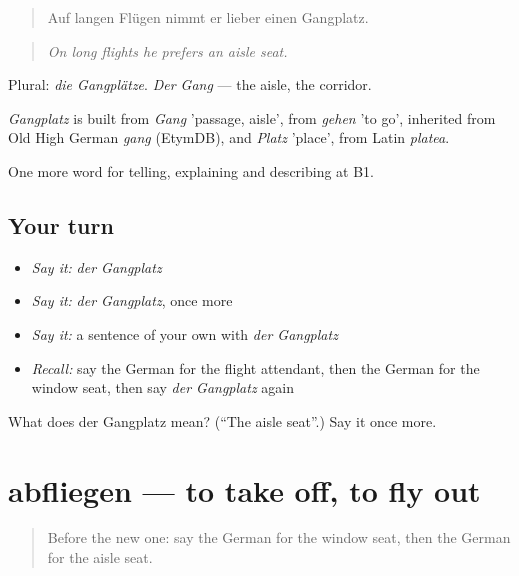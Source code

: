 \begin{quote}
Auf langen Flügen nimmt er lieber einen Gangplatz.
\end{quote}

\begin{quote}
\emph{On long flights he prefers an aisle seat.}
\end{quote}

Plural: \emph{die Gangplätze}. \emph{Der Gang} — the aisle, the corridor.

\begin{cousinweb}
\emph{Gangplatz} is built from \emph{Gang} 'passage, aisle', from \emph{gehen} 'to go', inherited from Old High German \emph{gang} (EtymDB), and \emph{Platz} 'place', from Latin \emph{platea}.
\end{cousinweb}

\begin{grammarlens}[title={What you've built}]
One more word for telling, explaining and describing at B1.
\end{grammarlens}

\subsection*{Your turn}
\begin{itemize}
\raggedright
  \item \emph{Say it:} \emph{der Gangplatz}
  \item \emph{Say it:} \emph{der Gangplatz}, once more
  \item \emph{Say it:} a sentence of your own with \emph{der Gangplatz}
  \item \emph{Recall:} say the German for the flight attendant, then the German for the window seat, then say \emph{der Gangplatz} again
\end{itemize}

\begin{tcolorbox}[breakable,colback=teal!4,colframe=teal!35!black,title={Before you move on}]
What does der Gangplatz mean? (\textquotedblleft{}The aisle seat\textquotedblright{}.) Say it once more.
\end{tcolorbox}
\section[abfliegen]{abfliegen — to take off, to fly out}

\label{lesson:GE-C418-abfliegen}



\begin{quote}
Before the new one: say the German for the window seat, then the German for the aisle seat.
\end{quote}

